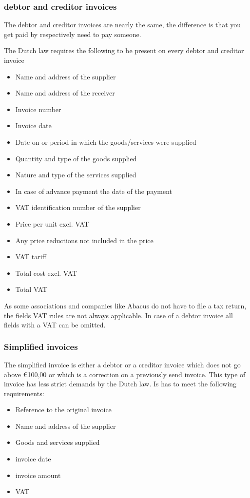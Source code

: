 \documentclass{report}
\begin{document}
\subsubsection{debtor and creditor invoices}
The debtor and creditor invoices are nearly the same, the difference is that you get paid by respectively need to pay someone.

The Dutch law requires the following to be present on every debtor and creditor invoice
\begin{itemize}
	\item Name and address of the supplier
	\item Name and address of the receiver
	\item Invoice number
	\item Invoice date
	\item Date on or period in which the goods/services were supplied
	\item Quantity and type of the goods supplied
	\item Nature and type of the services supplied
	\item In case of advance payment the date of the payment
	\item VAT identification number of the supplier
	\item Price per unit excl. VAT
	\item Any price reductions not included in the price
	\item VAT tariff
	\item Total cost excl. VAT
	\item Total VAT
\end{itemize}
As some associations and companies like Abacus do not have to file a tax return, the fields VAT rules are not always applicable. In case of a debtor invoice all fields with a VAT can be omitted.

\subsubsection{Simplified invoices}\label{subsec:simplified_invoice}
The simplified invoice is either a debtor or a creditor invoice which does not go above \euro100,00 or which is a correction on a previously send invoice.
This type of invoice has less strict demands by the Dutch law. Is has to meet the following requirements:
\begin{itemize}
	\item Reference to the original invoice
	\item Name and address of the supplier
	\item Goods and services supplied 
	\item invoice date
	\item invoice amount
	\item VAT
\end{itemize}
 
\end{document}
